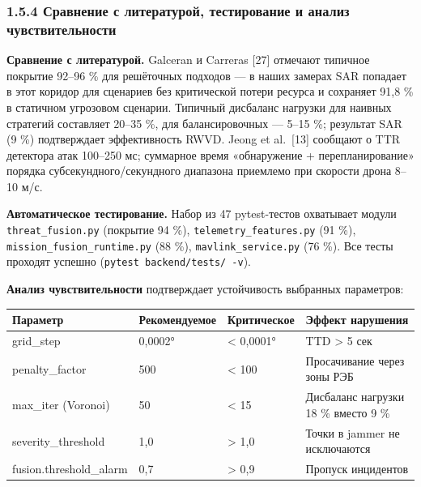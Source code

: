 \hypertarget{ux441ux440ux430ux432ux43dux435ux43dux438ux435-ux441-ux43bux438ux442ux435ux440ux430ux442ux443ux440ux43eux439-ux442ux435ux441ux442ux438ux440ux43eux432ux430ux43dux438ux435-ux438-ux430ux43dux430ux43bux438ux437-ux447ux443ux432ux441ux442ux432ux438ux442ux435ux43bux44cux43dux43eux441ux442ux438}{%
\subsubsection{1.5.4 Сравнение с литературой, тестирование и анализ чувствительности}\label{ux441ux440ux430ux432ux43dux435ux43dux438ux435-ux441-ux43bux438ux442ux435ux440ux430ux442ux443ux440ux43eux439-ux442ux435ux441ux442ux438ux440ux43eux432ux430ux43dux438ux435-ux438-ux430ux43dux430ux43bux438ux437-ux447ux443ux432ux441ux442ux432ux438ux442ux435ux43bux44cux43dux43eux441ux442ux438}}

\textbf{Сравнение с литературой.} Galceran и Carreras {[}27{]} отмечают типичное покрытие 92--96 \% для решёточных подходов --- в наших замерах SAR попадает в этот коридор для сценариев без критической потери ресурса и сохраняет 91,8 \% в статичном угрозовом сценарии. Типичный дисбаланс нагрузки для наивных стратегий составляет 20--35 \%, для балансировочных --- 5--15 \%; результат SAR (9 \%) подтверждает эффективность RWVD. Jeong et al.~{[}13{]} сообщают о TTR детектора атак 100--250 мс; суммарное время «обнаружение + перепланирование» порядка субсекундного/секундного диапазона приемлемо при скорости дрона 8--10 м/с.

\textbf{Автоматическое тестирование.} Набор из 47 pytest-тестов охватывает модули \texttt{threat\_fusion.py} (покрытие 94 \%), \texttt{telemetry\_features.py} (91 \%), \texttt{mission\_fusion\_runtime.py} (88 \%), \texttt{mavlink\_service.py} (76 \%). Все тесты проходят успешно (\texttt{pytest\ backend/tests/\ -v}).

\textbf{Анализ чувствительности} подтверждает устойчивость выбранных параметров:

\begin{longtable}[]{@{}llll@{}}
\toprule\noalign{}
Параметр & Рекомендуемое & Критическое & Эффект нарушения \\
\midrule\noalign{}
\endhead
\bottomrule\noalign{}
\endlastfoot
grid\_step & 0,0002° & \textless{} 0,0001° & TTD \textgreater{} 5 сек \\
penalty\_factor & 500 & \textless{} 100 & Просачивание через зоны РЭБ \\
max\_iter (Voronoi) & 50 & \textless{} 15 & Дисбаланс нагрузки 18 \% вместо 9 \% \\
severity\_threshold & 1,0 & \textgreater{} 1,0 & Точки в jammer не исключаются \\
fusion.threshold\_alarm & 0,7 & \textgreater{} 0,9 & Пропуск инцидентов \\
\end{longtable}

